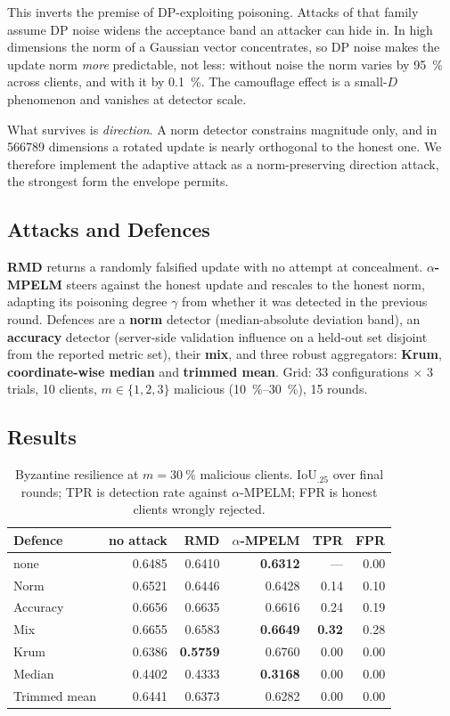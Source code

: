 This inverts the premise of DP-exploiting poisoning. Attacks of that family
assume DP noise widens the acceptance band an attacker can hide in. In high
dimensions the norm of a Gaussian vector concentrates, so DP noise makes the
update norm \emph{more} predictable, not less: without noise the norm varies by
\SI{95}{\percent} across clients, and with it by \SI{0.1}{\percent}. The
camouflage effect is a small-$D$ phenomenon and vanishes at detector scale.

What survives is \emph{direction}. A norm detector constrains magnitude only, and
in \num{566789} dimensions a rotated update is nearly orthogonal to the honest
one. We therefore implement the adaptive attack as a norm-preserving direction
attack, the strongest form the envelope permits.

\subsection{Attacks and Defences}

\textbf{RMD} returns a randomly falsified update with no attempt at concealment.
\textbf{$\alpha$-MPELM} steers against the honest update and rescales to the
honest norm, adapting its poisoning degree $\gamma$ from whether it was detected
in the previous round. Defences are a \textbf{norm} detector (median-absolute
deviation band), an \textbf{accuracy} detector (server-side validation influence
on a held-out set disjoint from the reported metric set), their \textbf{mix}, and
three robust aggregators: \textbf{Krum}, \textbf{coordinate-wise median} and
\textbf{trimmed mean}. Grid: 33 configurations $\times$ 3 trials, 10 clients,
$m\in\{1,2,3\}$ malicious (\SIrange{10}{30}{\percent}), 15 rounds.

\subsection{Results}

\begin{table}[t]
\centering
\caption{Byzantine resilience at $m=\SI{30}{\percent}$ malicious clients.
IoU$_{.25}$ over final rounds; TPR is detection rate against $\alpha$-MPELM;
FPR is honest clients wrongly rejected.}
\label{tab:p3}
\begin{tabular}{lrrrrr}
\toprule
Defence & no attack & RMD & $\alpha$-MPELM & TPR & FPR \\
\midrule
none & 0.6485 & 0.6410 & \textbf{0.6312} & --- & 0.00 \\
Norm & 0.6521 & 0.6446 & 0.6428 & 0.14 & 0.10 \\
Accuracy & 0.6656 & 0.6635 & 0.6616 & 0.24 & 0.19 \\
Mix & 0.6655 & 0.6583 & \textbf{0.6649} & \textbf{0.32} & 0.28 \\
Krum & 0.6386 & \textbf{0.5759} & 0.6760 & 0.00 & 0.00 \\
Median & 0.4402 & 0.4333 & \textbf{0.3168} & 0.00 & 0.00 \\
Trimmed mean & 0.6441 & 0.6373 & 0.6282 & 0.00 & 0.00 \\
\bottomrule
\end{tabular}
\end{table}

